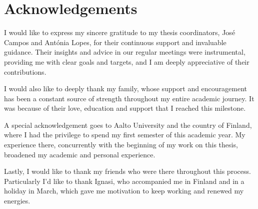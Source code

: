 \chapter*{Acknowledgements}

I would like to express my sincere gratitude to my thesis coordinators, José Campos and Antónia Lopes, for their continuous support and invaluable guidance.
Their insights and advice in our regular meetings were instrumental, providing me with clear goals and targets, and I am deeply appreciative of their contributions.

I would also like to deeply thank my family, whose support and encouragement has been a constant source of strength throughout my entire academic journey. 
It was because of their love, education and support that I reached this milestone.

A special acknowledgement goes to Aalto University and the country of Finland, where I had the privilege to spend my first semester of this academic year.
My experience there, concurrently with the beginning of my work on this thesis, broadened my academic and personal experience.

Lastly, I would like to thank my friends who were there throughout this process.
Particularly I'd like to thank Ignasi, who accompanied me in Finland and in a holiday in March,
which gave me motivation to keep working and renewed my energies. 


\vspace{10mm}
